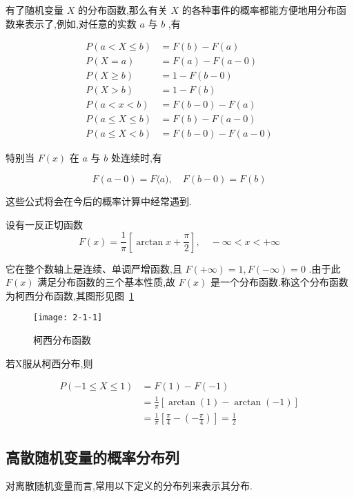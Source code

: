 有了随机变量 $ X $ 的分布函数,那么有关 $ X $ 的各种事件的概率都能方便地用分布函数来表示了,例如,对任意的实数 $ a $ 与 $ b $ ,有

\[ 
\begin{array}{rl}
P(a<X \leqslant b)&=F(b)-F(a)\\ 
P(X=a)&=F(a)-F(a-0) \\
P(X \geqslant b)&=1-F(b-0)\\
P(X>b)&=1-F(b)\\ 
P(a<x<b)&=F(b-0)-F(a)\\
P(a \leqslant X \leqslant b)&=F(b)-F(a-0)\\ 
P(a \leqslant X<b)&=F(b-0)-F(a-0)
\end{array}
\]

特别当 $ F(x) $ 在 $ a $ 与 $ b $ 处连续时,有

\[ 
F(a-0)=F\langle a), \quad F(b-0)=F(b)
\]

这些公式将会在今后的概率计算中经常遇到.

\begin{example}
	设有一反正切函数
	\[ 
	F(x)=\frac{1}{\pi}\left[\arctan x+\frac{\pi}{2}\right], \quad-\infty<x<+\infty
	\]
	
	它在整个数轴上是连续、单调严增函数,且 $ F(+\infty)=1, F(-\infty)=0 $ .由于此 $ F(x) $ 满足分布函数的三个基本性质,故 $ F(x) $ 是一个分布函数.称这个分布函数为柯西分布函数,其图形见图~\ref{fig:2-1-1}
	
	\begin{figure}
		\centering
		\texttt{[image: 2-1-1]}
		\caption{柯西分布函数}
		\label{fig:2-1-1}
	\end{figure}
	
	若X服从柯西分布,则
	
	\[ 
	\begin{aligned} P(-1 \leqslant X \leqslant 1) &=F(1)-F(-1) \\ &=\frac{1}{\pi}[\arctan (1)-\arctan (-1)] \\ &=\frac{1}{\pi}\left[\frac{\pi}{4}-\left(-\frac{\pi}{4}\right)\right]=\frac{1}{2} \end{aligned}
	\]
	
\end{example}

\subsection{高散随机变量的概率分布列}

对离散随机变量而言,常用以下定义的分布列来表示其分布.

